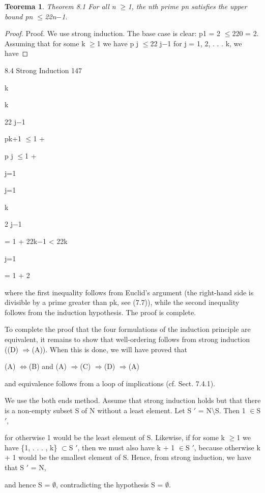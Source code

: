 \documentclass[11pt]{article}
\theoremstyle{plain}
\newtheorem{theorem}{Teorema}[section]
\theoremstyle{definition}
\begin{document}
\begin{theorem}
Theorem 8.1 For all n $\geq$1, the nth prime pn satisfies the upper bound pn $\leq$22n$-$1.
\end{theorem}

\begin{proof}
Proof. We use strong induction. The base case is clear: p1 = 2 $\leq$220 = 2. Assuming that for some k $\geq$1 we have p j $\leq$22 j$-$1 for j = 1, 2, . . . k, we have
\end{proof}

8.4 Strong Induction 147

k

k

22 j$-$1

pk+1 $\leq$1 +

p j $\leq$1 +

j=1

j=1

k

2 j$-$1

= 1 + 22k$-$1 < 22k

j=1

= 1 + 2

where the first inequality follows from Euclid's argument (the right-hand side is divisible by a prime greater than pk, see (7.7)), while the second inequality follows from the induction hypothesis. The proof is complete. 

To complete the proof that the four formulations of the induction principle are equivalent, it remains to show that well-ordering follows from strong induction ((D) $\Rightarrow$(A)). When this is done, we will have proved that

(A) $\Leftrightarrow$(B) and (A) $\Rightarrow$(C) $\Rightarrow$(D) $\Rightarrow$(A)

and equivalence follows from a loop of implications (cf. Sect. 7.4.1).

We use the both ends method. Assume that strong induction holds but that there is a non-empty subset S of N without a least element. Let S $'$ = N$\setminus$S. Then 1 $\in$S $'$,

for otherwise 1 would be the least element of S. Likewise, if for some k $\geq$1 we have \{1, . . . , k\} $\subset$S $'$, then we must also have k + 1 $\in$S $'$, because otherwise k + 1 would be the smallest element of S. Hence, from strong induction, we have that S $'$ = N,

and hence S = $\emptyset$, contradicting the hypothesis S = $\emptyset$.
\end{document}
